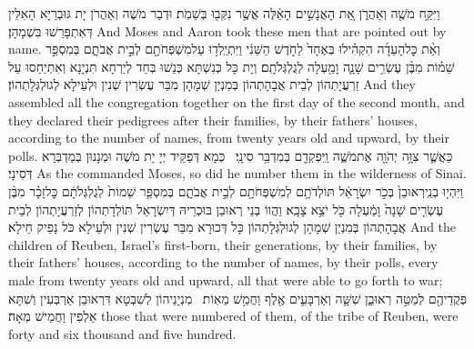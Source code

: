 {וַיִּקַּ֥ח מֹשֶׁ֖ה וְאַהֲרֹ֑ן אֵ֚ת הָאֲנָשִׁ֣ים הָאֵ֔לֶּה אֲשֶׁ֥ר נִקְּב֖וּ בְּשֵׁמֹֽת׃}
{וּדְבַר מֹשֶׁה וְאַהֲרֹן יָת גּוּבְרַיָּא הָאִלֵּין דְּאִתְפָּרַשׁוּ בִּשְׁמָהָן׃}
{And Moses and Aaron took these men that are pointed out by name.}{}
{וְאֵ֨ת כׇּל\maqqaf הָעֵדָ֜ה הִקְהִ֗ילוּ בְּאֶחָד֙ לַחֹ֣דֶשׁ הַשֵּׁנִ֔י וַיִּתְיַֽלְד֥וּ עַל\maqqaf מִשְׁפְּחֹתָ֖ם לְבֵ֣ית אֲבֹתָ֑ם בְּמִסְפַּ֣ר שֵׁמ֗וֹת מִבֶּ֨ן עֶשְׂרִ֥ים שָׁנָ֛ה וָמַ֖עְלָה לְגֻלְגְּלֹתָֽם׃}
{וְיָת כָּל כְּנִשְׁתָּא כְּנַשׁוּ בְּחַד לְיַרְחָא תִּנְיָנָא וְאִתְיַחַסוּ עַל זַרְעֲיָתְהוֹן לְבֵית אֲבָהָתְהוֹן בְּמִנְיַן שְׁמָהָן מִבַּר עֶשְׂרִין שְׁנִין וּלְעֵילָא לְגוּלְגְּלָתְהוֹן׃}
{And they assembled all the congregation together on the first day of the second month, and they declared their pedigrees after their families, by their fathers’ houses, according to the number of names, from twenty years old and upward, by their polls.}{}
{כַּאֲשֶׁ֛ר צִוָּ֥ה יְהֹוָ֖ה אֶת\maqqaf מֹשֶׁ֑ה וַֽיִּפְקְדֵ֖ם בְּמִדְבַּ֥ר סִינָֽי׃ \setuma }
{כְּמָא דְּפַקֵּיד יְיָ יָת מֹשֶׁה וּמְנָנוּן בְּמַדְבְּרָא דְּסִינָי׃}
{As the \lord\space commanded Moses, so did he number them in the wilderness of Sinai.}{}
{וַיִּהְי֤וּ בְנֵֽי\maqqaf רְאוּבֵן֙ בְּכֹ֣ר יִשְׂרָאֵ֔ל תּוֹלְדֹתָ֥ם לְמִשְׁפְּחֹתָ֖ם לְבֵ֣ית אֲבֹתָ֑ם בְּמִסְפַּ֤ר שֵׁמוֹת֙ לְגֻלְגְּלֹתָ֔ם כׇּל\maqqaf זָכָ֗ר מִבֶּ֨ן עֶשְׂרִ֤ים שָׁנָה֙ וָמַ֔עְלָה כֹּ֖ל יֹצֵ֥א צָבָֽא׃}
{וַהֲווֹ בְנֵי רְאוּבֵן בּוּכְרֵיהּ דְּיִשְׂרָאֵל תּוֹלְדָתְהוֹן לְזַרְעֲיָתְהוֹן לְבֵית אֲבָהָתְהוֹן בְּמִנְיַן שְׁמָהָן לְגוּלְגְּלָתְהוֹן כָּל דְּכוּרָא מִבַּר עֶשְׂרִין שְׁנִין וּלְעֵילָא כֹּל נָפֵיק חֵילָא׃}
{And the children of Reuben, Israel’s first-born, their generations, by their families, by their fathers’ houses, according to the number of names, by their polls, every male from twenty years old and upward, all that were able to go forth to war;}{}
{פְּקֻדֵיהֶ֖ם לְמַטֵּ֣ה רְאוּבֵ֑ן שִׁשָּׁ֧ה וְאַרְבָּעִ֛ים אֶ֖לֶף וַחֲמֵ֥שׁ מֵאֽוֹת׃ \petucha }
{מִנְיָנֵיהוֹן לְשִׁבְטָא דִּרְאוּבֵן אַרְבְּעִין וְשִׁתָּא אַלְפִין וַחֲמֵישׁ מְאָה׃}
{those that were numbered of them, of the tribe of Reuben, were forty and six thousand and five hundred.}{}
